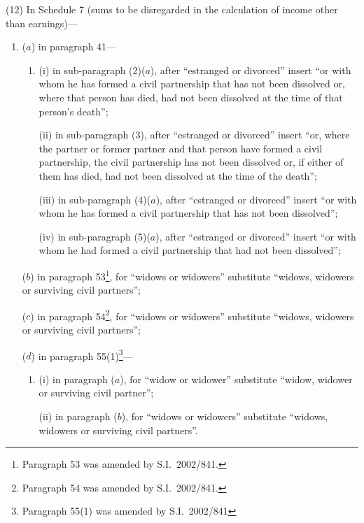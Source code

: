 \documentclass[12pt,a4paper]{article}
\begin{document}
(12) In Schedule 7 (sums to be disregarded in the calculation of income other than earnings)—
\begin{enumerate}\item[]
($a$) in paragraph 41—
\begin{enumerate}\item[]
(i) in sub-paragraph (2)($a$), after “estranged or divorced” insert “or with whom he has formed a civil partnership that has not been dissolved or, where that person has died, had not been dissolved at the time of that person’s death”;

(ii) in sub-paragraph (3), after “estranged or divorced” insert “or, where the partner or former partner and that person have formed a civil partnership, the civil partnership has not been dissolved or, if either of them has died, had not been dissolved at the time of the death”;

(iii) in sub-paragraph (4)($a$), after “estranged or divorced” insert “or with whom he has formed a civil partnership that has not been dissolved”;

(iv) in sub-paragraph (5)($a$), after “estranged or divorced” insert “or with whom he had formed a civil partnership that had not been dissolved”;
\end{enumerate}

($b$) in paragraph 53\footnote{Paragraph 53 was amended by S.I.\ 2002/841.}, for “widows or widowers” substitute “widows, widowers or surviving civil partners”;

($c$) in paragraph 54\footnote{Paragraph 54 was amended by S.I.\ 2002/841.}, for “widows or widowers” substitute “widows, widowers or surviving civil partners”;

($d$) in paragraph 55(1)\footnote{Paragraph 55(1) was amended by S.I.\ 2002/841}—
\begin{enumerate}\item[]
(i) in paragraph ($a$), for “widow or widower” substitute “widow, widower or surviving civil partner”;

(ii) in paragraph ($b$), for “widows or widowers” substitute “widows, widowers or surviving civil partners”.
\end{enumerate}
\end{enumerate}
\end{document}
